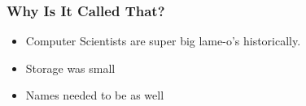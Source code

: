 \documentclass{beamer}
\theoremstyle{definition}
\begin{document}
\begin{frame}
\begin{center}
    \end{center}
\end{frame}


\begin{frame}
  \Large
  \frametitle{\huge Why Is It Called That?}

  \begin{itemize}
  \pause

  \item Computer Scientists are super big lame-o's historically.

  \pause

  \item Storage was small

  \pause 

  \item Names needed to be as well

  \end{itemize}

\end{frame}
\end{document}
